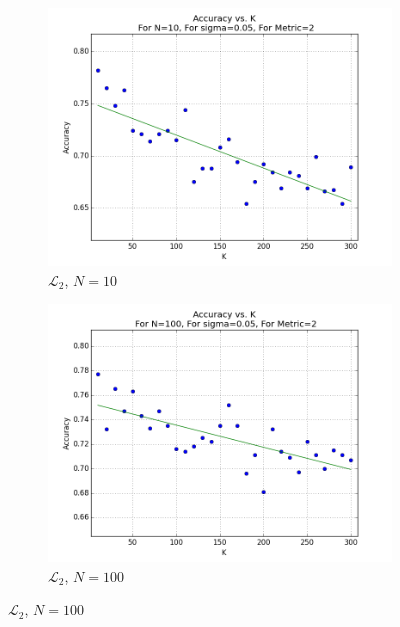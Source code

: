 \documentclass{article}
\begin{document}
\begin{figure}[H]
\centering
   \ContinuedFloat 
    \begin{subfigure}[h]{0.75\textwidth}
        \includegraphics[width=\textwidth]{l-experiment1-2-accuracy-k-n-10-s-005-l2.png}
        \caption{$\mathcal{L}_2$, $N=10$}
        \label{fig:exp2k1-2}
    \end{subfigure}
   \begin{subfigure}[h]{0.75\textwidth}
        \includegraphics[width=\textwidth]{l-experiment1-2-accuracy-k-n-100-s-005-l2.png}
        \caption{$\mathcal{L}_2$, $N=100$}
        \label{fig:exp2k2-2}
    \end{subfigure}
\end{figure}
\end{document}
